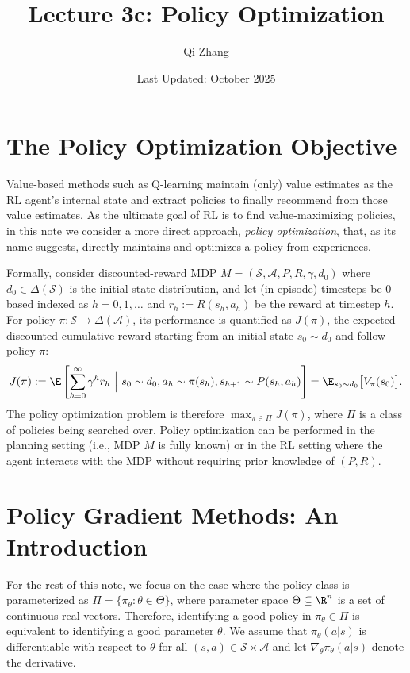 \title{Lecture 3c: Policy Optimization}
\author{Qi Zhang}
\date{Last Updated: October 2025}

\section{The Policy Optimization Objective}
Value-based methods such as Q-learning maintain (only) value estimates as the RL agent's internal state and extract policies to finally recommend from those value estimates.
As the ultimate goal of RL is to find value-maximizing policies, in this note we consider a more direct approach, {\em policy optimization}, that, as its name suggests, directly maintains and optimizes a policy from experiences.

Formally, consider discounted-reward MDP $M=(\mathcal{S},\mathcal{A}, P, R, \gamma, d_0)$ where $d_0\in\Delta(\mathcal{S})$ is the initial state distribution, and let (in-episode) timesteps be 0-based indexed as $h=0,1,\ldots$ and $r_h:=R(s_h,a_h)$ be the reward at timestep $h$.
For policy $\pi:\mathcal{S}\to\Delta(\mathcal{A})$, its performance is quantified as $J(\pi)$, the expected discounted cumulative reward starting from an initial state $s_0 \sim d_0$ and follow policy $\pi$:
\begin{align*}
    J(\pi):= \E\left[\sum_{h=0}^{\infty} \gamma^h r_h ~\Big|~ s_0\sim d_0, a_h \sim \pi(s_h), s_{h+1}\sim P(s_h, a_h) \right]
    = \E_{s_0\sim d_0} \big[ V_\pi(s_0) \big]
    .
\end{align*}
The policy optimization problem is therefore
$
    \max_{\pi \in \Pi} J(\pi)
$, where $\Pi$ is a class of policies being searched over.
Policy optimization can be performed in the planning setting (i.e., MDP $M$ is fully known) or in the RL setting where the agent interacts with the MDP without requiring prior knowledge of $(P, R)$.

\section{Policy Gradient Methods: An Introduction}
\label{sec:Policy Gradient Methods: An Introduction}
For the rest of this note, we focus on the case where the policy class is parameterized as $\Pi=\{\pi_\theta: \theta\in\Theta\}$, where parameter space $\Theta\subseteq\R^n$ is a set of continuous real vectors.
Therefore, identifying a good policy in $\pi_\theta \in \Pi$ is equivalent to identifying a good parameter $\theta$.
We assume that $\pi_\theta(a|s)$ is differentiable with respect to $\theta$ for all $(s,a)\in\mathcal{S}\times\mathcal{A}$ and let $\nabla_\theta\pi_\theta(a|s)$ denote the derivative.

